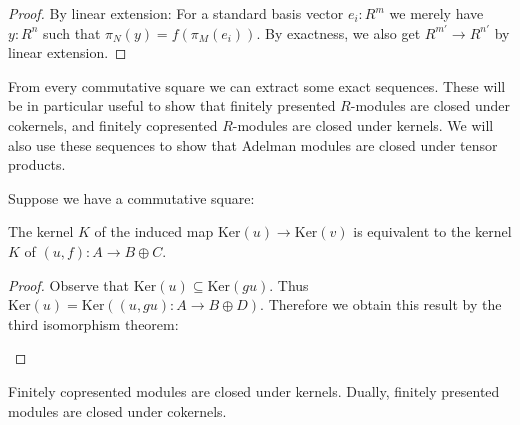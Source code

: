 \begin{proof}
  By linear extension: For a standard basis vector $e_i:R^m$ we merely have $y:R^n$ such that $\pi_N(y)=f(\pi_M(e_i))$. By exactness, we also get $R^{m'}\to R^{n'}$ by linear extension.
\end{proof}

From every commutative square we can extract some exact sequences.
These will be in particular useful to show that finitely presented $R$-modules are closed under cokernels, and finitely copresented $R$-modules are closed under kernels.
We will also use these sequences to show that Adelman modules are closed under tensor products.

\begin{lemma}
  \label{diff-ker-is-ker}
  Suppose we have a commutative square:
  \begin{center}
  \end{center}
  The kernel $K$ of the induced map $\mathrm{Ker}(u) \rightarrow \mathrm{Ker}(v)$ is equivalent to the kernel $K$ of $(u, f) : A \to B \oplus C$.
\end{lemma}

\begin{proof}
  Observe that $\mathrm{Ker}(u) \subseteq \mathrm{Ker}(gu)$.
  Thus $\mathrm{Ker}(u) = \mathrm{Ker}((u, gu) : A \to B \oplus D)$.
  Therefore we obtain this result by the third isomorphism theorem:
  \begin{center}
  \end{center}
  \hfill{\phantom{.}}
\end{proof}

\begin{proposition}
  \label{fcp-kernel-closure}
Finitely copresented modules are closed under kernels.
Dually, finitely presented modules are closed under cokernels.
\end{proposition}

